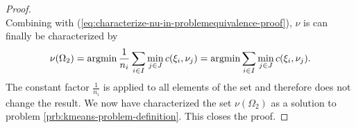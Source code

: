 \begin{proof}
\begin{equation}
  \end{equation}
  Combining with (\ref{eq:characterize-nu-in-problemequivalence-proof}), $\nu$ is can finally be characterized by
  \begin{equation}
    \label{eq:end-of-kmeans-proof}
    \nu(\Omega_2) = \operatorname{argmin} \frac{1}{n_i}\sum_{i\in I}\min\limits_{j\in J} c(\xi_i,\nu_j) = \operatorname{argmin} \sum_{i\in I}\min\limits_{j\in J} c(\xi_i,\nu_j).
  \end{equation}
  The constant factor $\frac{1}{n_i}$ is applied to all elements of the set and therefore does not change the result.
  We now have characterized the set $\nu(\Omega_2)$ as a solution to problem \ref{prb:kmeans-problem-definition}.
  This closes the proof.
\end{proof}
\begin{comment}
In this section, we analyze the computation of the Kantorovich distance for a different setup. Consider again two discrete stochastic processes $I$ and $J$ over time stages $T$ with values $\xi_i^t,\,i\in I$ and $\nu_j,\, j\in J,\;t\in T$. Here, the values $\xi_i^t$ and their probabilities $p_i$ for process $I$ are fixed, while the values $\nu_j^t$ and probabilities $q_j$ for process $J$ are to be selected such that the Kantorovich Distance $D_K(I,J)$ is minimal. The problem can be expressed as the NLP
\begin{align}
  \min\limits_{\eta,q,\nu}&\sum_{i\in I}\sum_{j\in J}\eta_{ij}c(\xi_i,\nu_j)\\
  \text{s.t.}&\sum_{i\in I}\eta_{ij} = q_j\\
  &\sum_{j\in J}\eta_{ij} = p_i\\
  &\eta_{ij}\geq 0\\
  &q\geq 0
\end{align}
As shown above in theorem \ref{thm:optimal-weights}, for any given set of $\nu_j^t$ the variables $\eta_{ij}$ and $q$ will take on the values 
\begin{align}
  \eta_{ij} &= \left\{\begin{array}{lr}p_i&\text{if }j=\underset{j\in J}{\operatorname{argmin}}\, c(\xi_i,\nu_j)\\0&\text{otherwise}\end{array}\right. ,\\
  q_j &= \sum_{i\in I_j}p_i\text{ with } I_j= \left\{i\in I|j=\underset{k\in J}{\operatorname{argmin}}\, c(\xi_i,\nu_j)\right\}.
\end{align}
This corresponds to a \textit{set partitioning} of the set $I$ into $|J|$ parts, defined by a mapping 
\[P:I\rightarrow J,\; i\mapsto \underset{j\in J}{\operatorname{argmin}}\, c(\xi_i, \nu_j)\]
Given the distances $c(\xi_i,\nu_j)$, the optimal partitioning of $I$ can be computed using theorem \ref{thm:optimal-weights} and algorithm \ref{alg:optimal-weights}. 


\end{comment}
